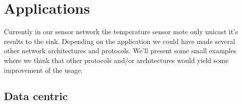 \section{Applications}
Currently in our sensor network the temperature sensor mote only unicast it's results to the sink. Depending on the application we could have made several other network architectures and protocols. We'll present some small examples where we think that other protocols and/or architectures would yield some improvement of the usage.
\subsection{Data centric}
 
